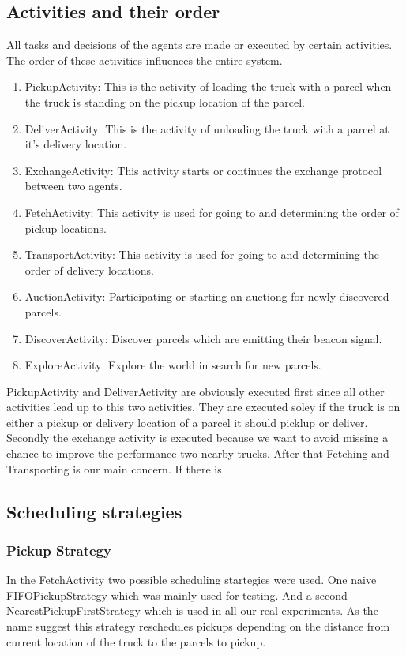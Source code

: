 \documentclass[../main.tex]{subfiles}
\begin{document}
\subsection{Activities and their order}
All tasks and decisions of the agents are made or executed by certain activities.
The order of these activities influences the entire system. 
\begin{enumerate}
	\item PickupActivity: This is the activity of loading the truck with a parcel when the truck is standing on the pickup location of the parcel.
	\item DeliverActivity: This is the activity of unloading the truck with a parcel at it's delivery location. 
	\item ExchangeActivity: This activity starts or continues the exchange protocol between two agents. 
	\item FetchActivity: This activity is used for going to and determining the order of pickup locations. 
	\item TransportActivity: This activity is used for going to and determining the order of delivery locations.   
	\item AuctionActivity: Participating or starting an auctiong for newly discovered parcels.
	\item DiscoverActivity: Discover parcels which are emitting their beacon signal. 
	\item ExploreActivity: Explore the world in search for new parcels.  
\end{enumerate}
PickupActivity and DeliverActivity are obviously executed first since all other activities lead up to this two activities. 
They are executed soley if the truck is on either a pickup or delivery location of a parcel it should picklup or deliver.
Secondly the exchange activity is executed because we want to avoid missing a chance to improve the performance two nearby trucks.
After that Fetching and Transporting is our main concern.
If there is 

\subsection{Scheduling strategies}
\subsubsection{Pickup Strategy}
In the FetchActivity two possible scheduling startegies were used.
One naive FIFOPickupStrategy which was mainly used for testing.
And a second NearestPickupFirstStrategy which is used in all our real experiments.
As the name suggest this strategy reschedules pickups depending on the distance from current location of the truck to the parcels to pickup.
\end{document}
